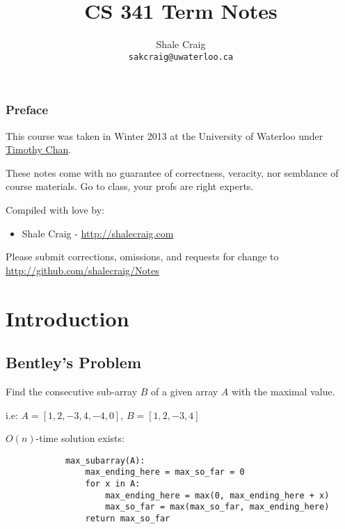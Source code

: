 \ifdefined\isphone
  
\else
  
\fi




\title{CS 341 Term Notes}

\author{
    Shale Craig\\
    \texttt{sakcraig@uwaterloo.ca}
}
\maketitle

\tableofcontents

\newpage

\subsection*{Preface} %
\label{sub:preface}
    This course was taken in Winter 2013 at the University of Waterloo under \href{https://cs.uwaterloo.ca/~tmchan/}{Timothy Chan}.

    These notes come with no guarantee of correctness, veracity, nor semblance of course materials.
    Go to class, your profs are right experts.

    Compiled with love by:
    \begin{itemize}
        \item Shale Craig - \url{http://shalecraig.com}
    \end{itemize}

    Please submit corrections, omissions, and requests for change to \url{http://github.com/shalecraig/Notes}

\chapter{Introduction}
    \section{Bentley's Problem}

        Find the consecutive sub-array $B$ of a given array $A$ with the maximal
        value.

        i.e: $A = [1, 2, -3, 4, -4, 0]$, $B = [1, 2, -3, 4]$

        $O(n)$-time solution exists:
        \begin{verbatim}
            max_subarray(A):
                max_ending_here = max_so_far = 0
                for x in A:
                    max_ending_here = max(0, max_ending_here + x)
                    max_so_far = max(max_so_far, max_ending_here)
                return max_so_far
        \end{verbatim}

